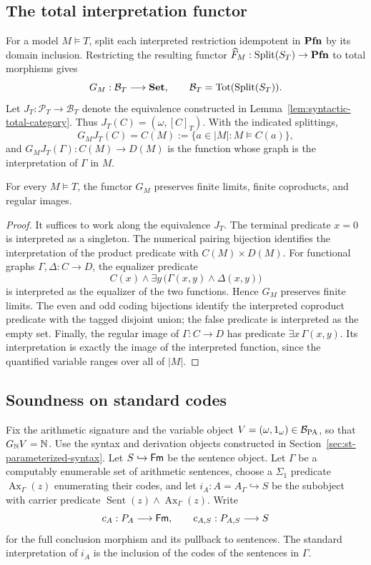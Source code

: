 \subsection{The total interpretation functor}

For a model $M\models T$, split each interpreted restriction
idempotent in $\mathbf{Pfn}$ by its domain inclusion. Restricting the resulting
functor $\widehat F_M:\operatorname{Split}(S_T)\to\mathbf{Pfn}$ to total morphisms gives
\[
 G_M:\mathcal B_T\longrightarrow\mathbf{Set},
 \qquad \mathcal B_T=\operatorname{Tot}(\operatorname{Split}(S_T)).
\]
Let $J_T:\mathcal P_T\to\mathcal B_T$ denote the equivalence
constructed in Lemma~\ref{lem:syntactic-total-category}. Thus
$J_T(C)=(\omega,[C]_T)$. With the indicated splittings,
\[
 G_MJ_T(C)=C(M):=\{a\in |M|:M\models C(a)\},
\]
and $G_MJ_T(\Gamma):C(M)\to D(M)$ is the function whose graph
is the interpretation of $\Gamma$ in $M$.

\begin{proposition}\label{prop:model-total-regular}
For every $M\models T$, the functor $G_M$ preserves finite limits,
finite coproducts, and regular images.
\end{proposition}
\begin{proof}
It suffices to work along the equivalence $J_T$.
The terminal predicate $x=0$ is interpreted as a singleton.
The numerical pairing bijection identifies the interpretation of
the product predicate with $C(M)\times D(M)$. For functional graphs
$\Gamma,\Delta:C\to D$, the equalizer predicate
\[
 C(x)\land\exists y\,
             \bigl(\Gamma(x,y)\land\Delta(x,y)\bigr)
\]
is interpreted as the equalizer of the two functions. Hence $G_M$
preserves finite limits. The even and odd coding bijections identify
the interpreted coproduct predicate with the tagged disjoint union;
the false predicate is interpreted as the empty set. Finally,
the regular image of $\Gamma:C\to D$ has predicate
$\exists x\,\Gamma(x,y)$. Its interpretation is exactly the image
of the interpreted function, since the quantified variable ranges
over all of $|M|$.
\end{proof}

\subsection{Soundness on standard codes}

Fix the arithmetic signature and the variable object
$V=(\omega,1_\omega)\in\mathcal B_{\mathrm{PA}}$, so that
$G_{\mathbb N}V=\mathbb N$. Use the syntax and derivation objects
constructed in Section~\ref{sec:st-parameterized-syntax}. Let
$S\hookrightarrow\mathsf{Fm}$ be the sentence object. Let $\Gamma$ be
a computably enumerable set of arithmetic sentences, choose a
$\Sigma_1$ predicate $\operatorname{Ax}_\Gamma(z)$ enumerating
their codes, and let $i_A:A=A_\Gamma\hookrightarrow S$
be the subobject with carrier predicate
$\operatorname{Sent}(z)\land\operatorname{Ax}_\Gamma(z)$. Write
\[
 c_A:P_A\longrightarrow\mathsf{Fm},\qquad
 c_{A,S}:P_{A,S}\longrightarrow S
\]
for the full conclusion morphism and its pullback to sentences.
The standard interpretation of $i_A$ is the inclusion of the
codes of the sentences in $\Gamma$.

